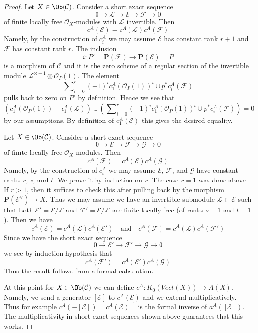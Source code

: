 \begin{proof}
\medskip\noindent
Let $X \in \Ob(\mathcal{C})$. Consider a short exact sequence
$$
0 \to \mathcal{L} \to \mathcal{E} \to \mathcal{F} \to 0
$$
of finite locally free $\mathcal{O}_X$-modules with $\mathcal{L}$ invertible.
Then
$$
c^A(\mathcal{E}) = c^A(\mathcal{L}) c^A(\mathcal{F})
$$
Namely, by the construction of $c^A_i$ we may assume $\mathcal{E}$ has
constant rank $r + 1$ and $\mathcal{F}$ has constant rank $r$.
The inclusion
$$
i : P' = \mathbf{P}(\mathcal{F}) \longrightarrow \mathbf{P}(\mathcal{E}) = P
$$
is a morphism of $\mathcal{C}$ and it is the zero scheme of a regular
section of the invertible module
$\mathcal{L}^{\otimes -1} \otimes \mathcal{O}_P(1)$.
The element
$$
\sum\nolimits_{i = 0}^r (-1)^i c_1^A(\mathcal{O}_P(1))^i \cup
p^*c^A_i(\mathcal{F})
$$
pulls back to zero on $P'$ by definition. Hence we see that
$$
\left(c_1^A(\mathcal{O}_P(1)) - c_1^A(\mathcal{L})\right) \cup
\left(\sum\nolimits_{i = 0}^r (-1)^i c_1^A(\mathcal{O}_P(1))^i \cup
p^*c^A_i(\mathcal{F})\right) = 0
$$
by our assumptions. By definition of $c_1^A(\mathcal{E})$
this gives the desired equality.

\medskip\noindent
Let $X \in \Ob(\mathcal{C})$. Consider a short exact sequence
$$
0 \to \mathcal{E} \to \mathcal{F} \to \mathcal{G} \to 0
$$
of finite locally free $\mathcal{O}_X$-modules. Then
$$
c^A(\mathcal{F}) = c^A(\mathcal{E}) c^A(\mathcal{G})
$$
Namely, by the construction of $c^A_i$ we may assume
$\mathcal{E}$, $\mathcal{F}$, and $\mathcal{G}$ have
constant ranks $r$, $s$, and $t$. We prove it by induction on $r$.
The case $r = 1$ was done above. If $r > 1$, then it suffices to check
this after pulling back by the morphism $\mathbf{P}(\mathcal{E}^\vee) \to X$.
Thus we may assume we have an invertible submodule
$\mathcal{L} \subset \mathcal{E}$ such that both
$\mathcal{E}' = \mathcal{E}/\mathcal{L}$ and
$\mathcal{F}' = \mathcal{E}/\mathcal{L}$ are finite locally free
(of ranks $s - 1$ and $t - 1$). Then we have
$$
c^A(\mathcal{E}) = c^A(\mathcal{L}) c^A(\mathcal{E}')
\quad\text{and}\quad
c^A(\mathcal{F}) = c^A(\mathcal{L}) c^A(\mathcal{F}')
$$
Since we have the short exact sequence
$$
0 \to \mathcal{E}' \to \mathcal{F}' \to \mathcal{G} \to 0
$$
we see by induction hypothesis that
$$
c^A(\mathcal{F}') = c^A(\mathcal{E}') c^A(\mathcal{G})
$$
Thus the result follows from a formal calculation.

\medskip\noindent
At this point for $X \in \Ob(\mathcal{C})$
we can define $c^A : K_0(\textit{Vect}(X)) \to A(X)$.
Namely, we send a generator $[\mathcal{E}]$ to $c^A(\mathcal{E})$
and we extend multiplicatively. Thus for example
$c^A(-[\mathcal{E}]) = c^A(\mathcal{E})^{-1}$ is the formal
inverse of $a^A([\mathcal{E}])$.
The multiplicativity in short exact sequences shown above
guarantees that this works.


\end{proof}
